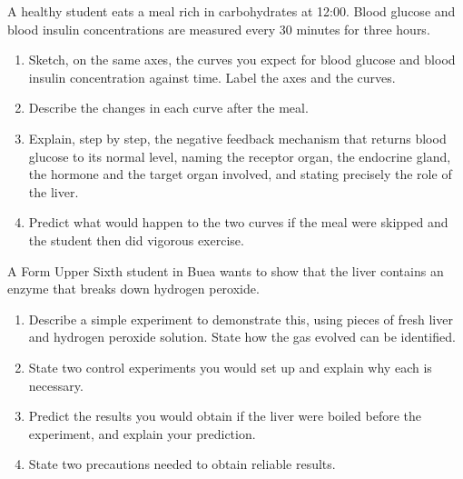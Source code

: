 \documentclass[11pt]{article}
\newcounter{popsec}
\newcounter{popsub}
\newcommand{\courssub}[1]{%
  \stepcounter{popsub}%
  \par\vspace{9pt}\noindent{\popxbold\fontsize{11.5}{13}\selectfont\color{popink}{\color{poporange}\thepopsec.\thepopsub}\hspace{6pt}#1}\par\nopagebreak\vspace{4pt}
}
\begin{document}
\begin{exercice}
A healthy student eats a meal rich in carbohydrates at 12:00. Blood glucose and blood insulin concentrations are measured every 30 minutes for three hours.
\begin{enumerate}
\item Sketch, on the same axes, the curves you expect for blood glucose and blood insulin concentration against time. Label the axes and the curves.
\item Describe the changes in each curve after the meal.
\item Explain, step by step, the negative feedback mechanism that returns blood glucose to its normal level, naming the receptor organ, the endocrine gland, the hormone and the target organ involved, and stating precisely the role of the liver.
\item Predict what would happen to the two curves if the meal were skipped and the student then did vigorous exercise.
\end{enumerate}
\end{exercice}

\begin{exercice}
A Form Upper Sixth student in Buea wants to show that the liver contains an enzyme that breaks down hydrogen peroxide.
\begin{enumerate}
\item Describe a simple experiment to demonstrate this, using pieces of fresh liver and hydrogen peroxide solution. State how the gas evolved can be identified.
\item State two control experiments you would set up and explain why each is necessary.
\item Predict the results you would obtain if the liver were boiled before the experiment, and explain your prediction.
\item State two precautions needed to obtain reliable results.
\end{enumerate}
\end{exercice}

\courssub{I prepare for the GCE}
\end{document}
